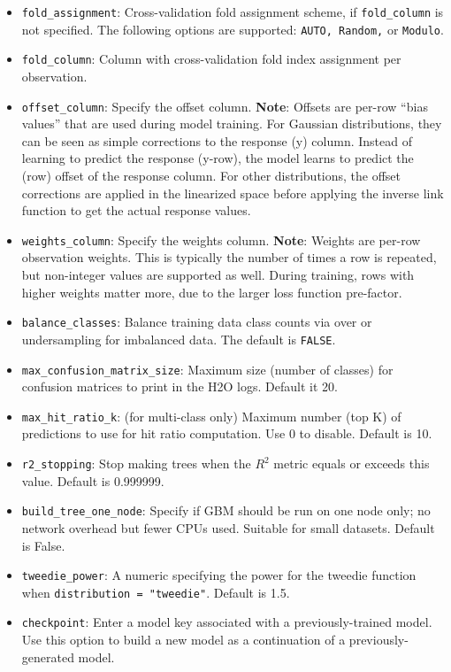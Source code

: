 \begin{itemize}
\item \texttt{fold\_assignment}: Cross-validation fold assignment scheme, if \texttt{fold\_column} is not specified. The following options are supported: \texttt{AUTO, Random,} or \texttt{Modulo}. 
\item \texttt{fold\_column}:  Column with cross-validation fold index assignment per observation. 
\item \texttt{offset\_column}: Specify the offset column. {\textbf{Note}}: Offsets are per-row “bias values” that are used during model training. For Gaussian distributions, they can be seen as simple corrections to the response (y) column. Instead of learning to predict the response (y-row), the model learns to predict the (row) offset of the response column. For other distributions, the offset corrections are applied in the linearized space before applying the inverse link function to get the actual response values. 
\item \texttt{weights\_column}: Specify the weights column. {\textbf{Note}}: Weights are per-row observation weights. This is typically the number of times a row is repeated, but non-integer values are supported as well. During training, rows with higher weights matter more, due to the larger loss function pre-factor.
\item {\texttt{balance\_classes}}: Balance training data class counts via over or undersampling for imbalanced data. The default is {\texttt{FALSE}}.
\item {\texttt{max\_confusion\_matrix\_size}}: Maximum size (number of classes) for confusion matrices to print in the H2O logs.  Default it 20.
\item {\texttt{max\_hit\_ratio\_k}}: (for multi-class only) Maximum number (top K) of predictions to use for hit ratio computation.  Use 0 to disable.  Default is 10.
\item {\texttt{r2\_stopping}}: Stop making trees when the $R^2$ metric equals or exceeds this value.  Default is 0.999999.
\item {\texttt{build\_tree\_one\_node}}: Specify if GBM should be run on one node only; no network overhead but fewer CPUs used. Suitable for small datasets.  Default is False.
\item {\texttt{tweedie\_power}}: A numeric specifying the power for the tweedie function when \texttt{distribution = "tweedie"}.  Default is 1.5.
\item {\texttt{checkpoint}}: Enter a model key associated with a previously-trained model. Use this option to build a new model as a continuation of a previously-generated model.

\end{itemize}
